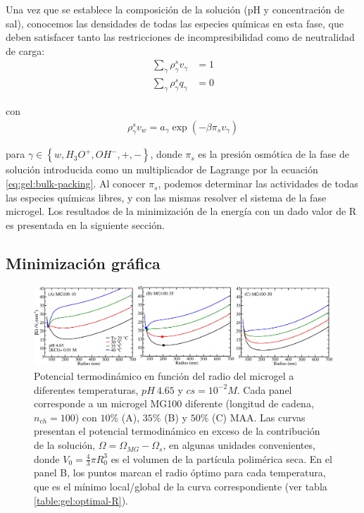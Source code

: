Una vez que se establece la composición de la soluci\'on (pH y concentraci\'on de sal), conocemos las densidades de todas las especies qu\'imicas en esta fase, que deben satisfacer tanto las restricciones de incompresibilidad como de neutralidad de carga:
%
%
\begin{align}
\sum_{\gamma  } \rho_\gamma^s v_\gamma  &=1\label{eq:gel:bulk-packing}\\
\sum_{\gamma  } \rho_\gamma^s q_\gamma  &=0
\end{align}

\noindent con
%
%
\begin{align}
\rho_\gamma^s v_w= a_\gamma \exp(-\beta\pi_s v_\gamma)
\label{eq:gel:bulk-electroneutrality}
\end{align}



\noindent para $\gamma \in \left\{ w, H_3O^+, OH^-, +,- \right\}$, donde $\pi_s$ es la presi\'on osm\'otica de la fase de soluci\'on introducida como un multiplicador de Lagrange por la ecuaci\'on \ref{eq:gel:bulk-packing}.
Al conocer $\pi_s$, podemos determinar las actividades de todas las especies qu\'imicas libres, y con las mismas resolver el sistema de la fase microgel.
Los resultados de la minimizaci\'on de la energ\'ia con un dado valor de R es presentada en la siguiente secci\'on.

\subsection{Minimizaci\'on gr\'afica}\label{sec:gel:minimi}

\begin{figure}[!htb]
\centering
\includegraphics[width=1.\linewidth]{Figures/graph-gel/graph-min.png}
\caption{Potencial termodin\'amico en funci\'on del radio del microgel a diferentes temperaturas, $pH~4.65$ y $cs=10^{-2}M$.
	Cada panel corresponde a un microgel MG100 diferente (longitud de cadena, $n_{ch}=100$) con $10\%$ (A), $35\%$ (B) y $50\%$ (C) MAA.
	Las curvas presentan el potencial termodin\'amico en exceso de la contribuci\'on de la soluci\'on, $\Omega=\Omega_{MG}-\Omega_s$, en algunas unidades convenientes, donde $V_0=\frac{4}{3}\pi R_0^3$ es el volumen de la part\'icula polim\'erica seca.
	En el panel B, los puntos  marcan el radio \'optimo para cada temperatura, que es el m\'inimo local/global de la curva correspondiente (ver tabla \ref{table:gel:optimal-R}).}
\label{fig:gel:graph-min}
\end{figure}

